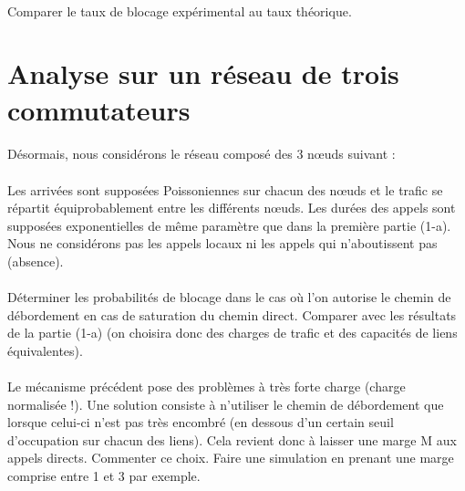         \paragraph{}
        Comparer le taux de blocage expérimental au taux théorique.
%
    \clearpage
%
%
%
    \section{Analyse sur un réseau de trois commutateurs}
%
        \paragraph{}
        Désormais, nous considérons le réseau composé des 3 nœuds suivant :

        \paragraph{}
        Les arrivées sont supposées Poissoniennes sur chacun des nœuds et le trafic se répartit équiprobablement entre les différents nœuds. Les durées des appels sont supposées exponentielles de même paramètre que dans la première partie (1-a). Nous ne considérons pas les appels locaux ni les appels qui n'aboutissent pas (absence).

        \paragraph{}
        Déterminer les probabilités de blocage dans le cas où l'on autorise le chemin de débordement en cas de saturation du chemin direct. Comparer avec les résultats de la partie (1-a) (on choisira donc des charges de trafic et des capacités de liens équivalentes).

        \paragraph{}
        Le mécanisme précédent pose des problèmes à très forte charge (charge normalisée !). Une solution consiste à n'utiliser le chemin de débordement que lorsque celui-ci n'est pas très encombré (en dessous d'un certain seuil d'occupation sur chacun des liens). Cela revient donc à laisser une marge M aux appels directs. Commenter ce choix. Faire une simulation en prenant une marge comprise entre 1 et 3 par exemple.
%
    \clearpage
%
